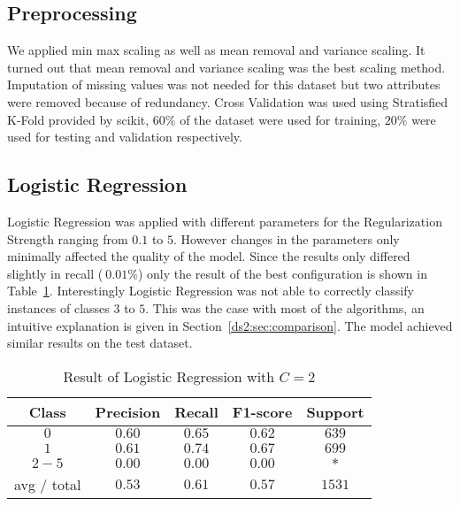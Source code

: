 \subsection{Preprocessing}
We applied min max scaling as well as mean removal and variance scaling. It turned out that mean removal and variance scaling was the best scaling method. Imputation of missing values was not needed for this dataset but two attributes were removed because of redundancy. Cross Validation was used using Stratisfied K-Fold provided by scikit, $60\%$ of the dataset were used for training, $20\%$ were used for testing and validation respectively. 
\subsection{Logistic Regression}
Logistic Regression was applied with different parameters for the Regularization Strength ranging from $0.1$ to $5$. However changes in the parameters only minimally affected the quality of the model. Since the results only differed slightly in recall ($~0.01\%$) only the result of the best configuration is shown in Table~\ref{ds2:table:lr}. Interestingly Logistic Regression was not able to correctly classify instances of classes $3$ to $5$. This was the case with most of the algorithms, an intuitive explanation is given in Section~\ref{ds2:sec:comparison}. The model achieved similar results on the test dataset.

\begin{table}[p]
\begin{center}
\begin{tabular}{|c|c|c|c|c|}
\hline Class & Precision & Recall & F1-score & Support \\
\hline  $0$    &   $0.60$    & $ 0.65$  &   $ 0.62$  &     $639$ \\
\hline  $1$    &   $0.61$    &  $0.74$  &   $ 0.67$  &     $699$ \\
\hline  $2-5$  &   $0.00$    &  $0.00$  &    $0.00$  &     $*$ \\
\hline avg / total &      $0.53$  &    $0.61$  &    $0.57$  &   $1531$\\
\hline
\end{tabular}

\caption{Result of Logistic Regression with $C=2$}
\label{ds2:table:lr}
\end{center}
\end{table}


